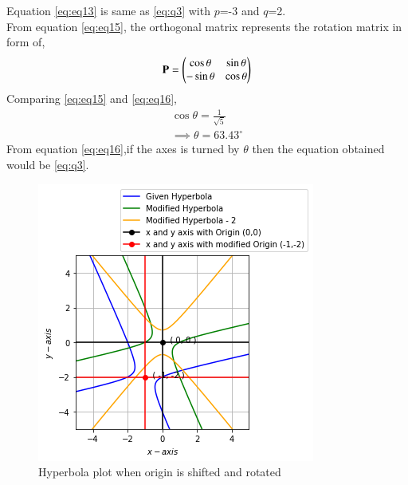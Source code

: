 \documentclass[journal,12pt,twocolumn]{IEEEtran}
\begin{document}
Equation \eqref{eq:eq13} is same as \eqref{eq:q3} with $p$=-3 and $q$=2.\\
From equation \eqref{eq:eq15}, the orthogonal matrix represents the rotation matrix in form of,
\begin{align}
    \mathbf{P}=\begin{pmatrix}\cos\theta & \sin\theta\\ -\sin\theta& \cos\theta\end{pmatrix} \label{eq:eq16}
\end{align}
Comparing \eqref{eq:eq15} and \eqref{eq:eq16},
\begin{align}
    \cos\theta = \frac{1}{\sqrt{5}}\\
    \implies \boxed{\theta = 63.43^{\circ}}
\end{align}
From equation \eqref{eq:eq16},if the axes is turned by $\theta$ then the equation obtained would be \eqref{eq:q3}.
\renewcommand{\thefigure}{\arabic{figure}}
\begin{figure}[h!]
	\centering
	\includegraphics[width=\columnwidth]{hyperbola.png}
	\caption{Hyperbola plot when origin is shifted and rotated}
	\label{myfig}
\end{figure}
\\
\end{document}

